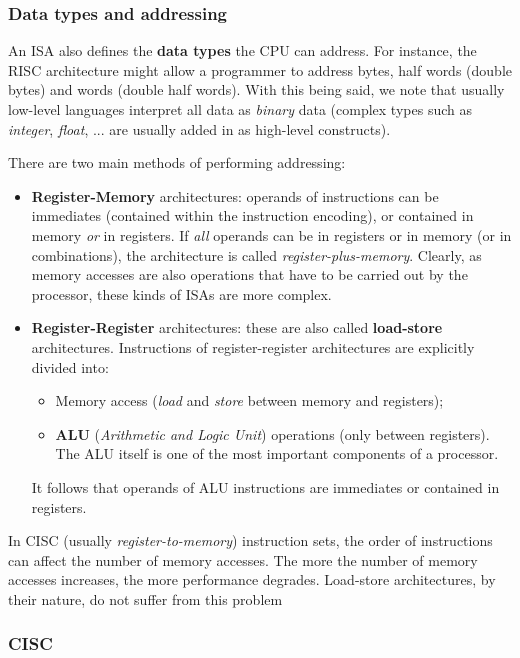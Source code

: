 \documentclass[a4paper,11pt]{article}
\begin{document}
\subsubsection{Data types and addressing}

An ISA also defines the \textbf{data types} the CPU can address.
For instance, the RISC architecture might allow a programmer to address bytes, half words (double bytes) and words (double half words).
With this being said, we note that usually low-level languages interpret all data as \textit{binary} data (complex types such as \textit{integer}, \textit{float}, ... are usually added in as high-level constructs). 

There are two main methods of performing addressing:
\begin{itemize}
	\item \textbf{Register-Memory} architectures: operands of instructions can be immediates (contained within the instruction encoding), or contained in memory \textit{or} in registers. If \textit{all} operands can be in registers or in memory (or in combinations), the architecture is called \textit{register-plus-memory}. Clearly, as memory accesses are also operations that have to be carried out by the processor, these kinds of ISAs are more complex.
	\item \textbf{Register-Register} architectures: these are also called \textbf{load-store} architectures. Instructions of register-register architectures are explicitly divided into:
		\begin{itemize}
			\item Memory access (\textit{load} and \textit{store} between memory and registers);
			\item \textbf{ALU} (\textit{Arithmetic and Logic Unit}) operations (only between registers). The ALU itself is one of the most important components of a processor.
		\end{itemize}
		It follows that operands of ALU instructions are immediates or contained in registers.
\end{itemize}


In CISC (usually \textit{register-to-memory}) instruction sets, the order of instructions can affect the number of memory accesses.
The more the number of memory accesses increases, the more performance degrades.
Load-store architectures, by their nature, do not suffer from this problem

\subsubsection{CISC}
\end{document}
